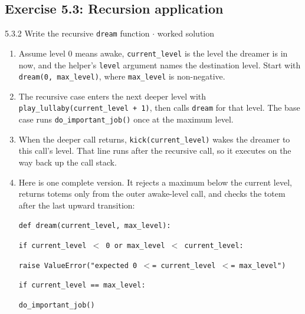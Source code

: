 \documentclass[11pt]{article}
\begin{document}
\begin{keepsection}\subsection{Exercise 5.3: Recursion application}

\begin{workedbox}{5.3.2 Write the recursive \texttt{dream} function \ensuremath{\cdot} worked solution}
\begin{enumerate}
\item Assume level 0 means awake, \texttt{current\_level} is the level the dreamer is in now, and the helper's \texttt{level} argument names the destination level. Start with \texttt{dream(0, max\_level)}, where \texttt{max\_level} is non-negative.
\item The recursive case enters the next deeper level with \texttt{play\_lullaby(current\_level + 1)}, then calls \texttt{dream} for that level. The base case runs \texttt{do\_important\_job()} once at the maximum level.
\item When the deeper call returns, \texttt{kick(current\_level)} wakes the dreamer to this call's level. That line runs after the recursive call, so it executes on the way back up the call stack.
\item {}
Here is one complete version. It rejects a maximum below the current level, returns totems only from the outer awake-level call, and checks the totem after the last upward transition:
\begin{tcolorbox}[colback=Paperblue,colframe=Paperblue,boxrule=0pt,arc=0pt,left=7pt,right=7pt,top=5pt,bottom=5pt]\small\sloppy
\noindent\hspace*{0em}\texttt{def dream(current\_level, max\_level):}\par
\noindent\hspace*{1em}\texttt{if current\_level \ensuremath{<} 0 or max\_level \ensuremath{<} current\_level:}\par
\noindent\hspace*{3em}\texttt{raise ValueError("expected 0 \ensuremath{<}= current\_level \ensuremath{<}= max\_level")}\par
\noindent\hspace*{0em}\texttt{}\par
\noindent\hspace*{1em}\texttt{if current\_level == max\_level:}\par
\noindent\hspace*{3em}\texttt{do\_important\_job()}\par

\end{tcolorbox}
\end{enumerate}
\end{workedbox}
\end{keepsection}
\end{document}
